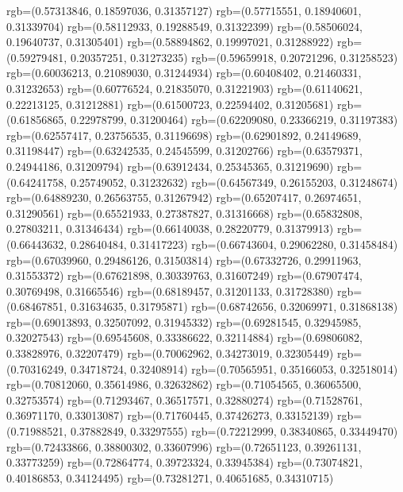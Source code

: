 {{        rgb=(0.57313846, 0.18597036, 0.31357127)
        rgb=(0.57715551, 0.18940601, 0.31339704)
        rgb=(0.58112933, 0.19288549, 0.31322399)
        rgb=(0.58506024, 0.19640737, 0.31305401)
        rgb=(0.58894862, 0.19997021, 0.31288922)
        rgb=(0.59279481, 0.20357251, 0.31273235)
        rgb=(0.59659918, 0.20721296, 0.31258523)
        rgb=(0.60036213, 0.21089030, 0.31244934)
        rgb=(0.60408402, 0.21460331, 0.31232653)
        rgb=(0.60776524, 0.21835070, 0.31221903)
        rgb=(0.61140621, 0.22213125, 0.31212881)
        rgb=(0.61500723, 0.22594402, 0.31205681)
        rgb=(0.61856865, 0.22978799, 0.31200464)
        rgb=(0.62209080, 0.23366219, 0.31197383)
        rgb=(0.62557417, 0.23756535, 0.31196698)
        rgb=(0.62901892, 0.24149689, 0.31198447)
        rgb=(0.63242535, 0.24545599, 0.31202766)
        rgb=(0.63579371, 0.24944186, 0.31209794)
        rgb=(0.63912434, 0.25345365, 0.31219690)
        rgb=(0.64241758, 0.25749052, 0.31232632)
        rgb=(0.64567349, 0.26155203, 0.31248674)
        rgb=(0.64889230, 0.26563755, 0.31267942)
        rgb=(0.65207417, 0.26974651, 0.31290561)
        rgb=(0.65521933, 0.27387827, 0.31316668)
        rgb=(0.65832808, 0.27803211, 0.31346434)
        rgb=(0.66140038, 0.28220779, 0.31379913)
        rgb=(0.66443632, 0.28640484, 0.31417223)
        rgb=(0.66743604, 0.29062280, 0.31458484)
        rgb=(0.67039960, 0.29486126, 0.31503814)
        rgb=(0.67332726, 0.29911963, 0.31553372)
        rgb=(0.67621898, 0.30339763, 0.31607249)
        rgb=(0.67907474, 0.30769498, 0.31665546)
        rgb=(0.68189457, 0.31201133, 0.31728380)
        rgb=(0.68467851, 0.31634635, 0.31795871)
        rgb=(0.68742656, 0.32069971, 0.31868138)
        rgb=(0.69013893, 0.32507092, 0.31945332)
        rgb=(0.69281545, 0.32945985, 0.32027543)
        rgb=(0.69545608, 0.33386622, 0.32114884)
        rgb=(0.69806082, 0.33828976, 0.32207479)
        rgb=(0.70062962, 0.34273019, 0.32305449)
        rgb=(0.70316249, 0.34718724, 0.32408914)
        rgb=(0.70565951, 0.35166053, 0.32518014)
        rgb=(0.70812060, 0.35614986, 0.32632862)
        rgb=(0.71054565, 0.36065500, 0.32753574)
        rgb=(0.71293467, 0.36517571, 0.32880274)
        rgb=(0.71528761, 0.36971170, 0.33013087)
        rgb=(0.71760445, 0.37426273, 0.33152139)
        rgb=(0.71988521, 0.37882849, 0.33297555)
        rgb=(0.72212999, 0.38340865, 0.33449470)
        rgb=(0.72433866, 0.38800302, 0.33607996)
        rgb=(0.72651123, 0.39261131, 0.33773259)
        rgb=(0.72864774, 0.39723324, 0.33945384)
        rgb=(0.73074821, 0.40186853, 0.34124495)
        rgb=(0.73281271, 0.40651685, 0.34310715)
}}

